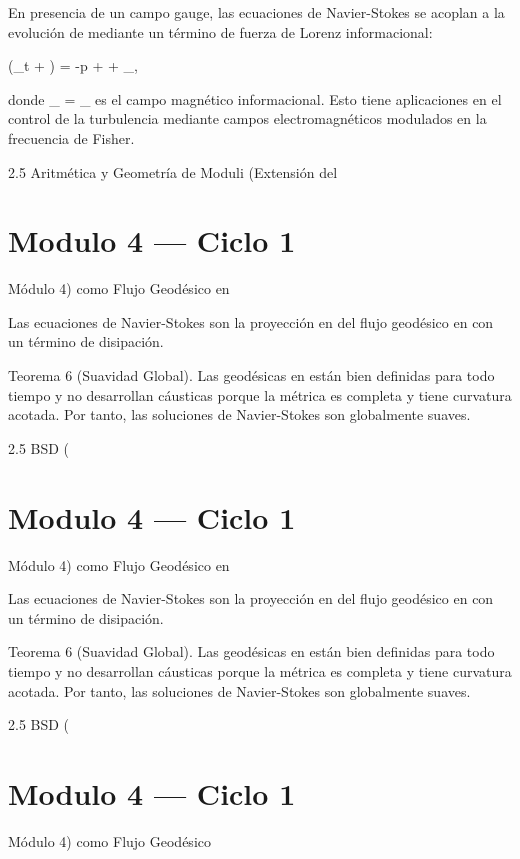 \documentclass[12pt,twoside]{book}
\begin{document}
En presencia de un campo gauge, las ecuaciones de Navier-Stokes se acoplan a la evolución de  \rho  mediante un término de fuerza de Lorenz informacional:

\rho (\partial_t  + \cdot\nabla{}) = -\nabla p + \nu \Delta {} +  \times {}_{},

donde  _{} = \nabla \times {}_{}  es el campo magnético informacional. Esto tiene aplicaciones en el control de la turbulencia mediante campos electromagnéticos modulados en la frecuencia de Fisher.

2.5 Aritmética y Geometría de Moduli (Extensión del 

\chapter{Modulo 4 — Ciclo 1}
Módulo 4) como Flujo Geodésico en   

Las ecuaciones de Navier-Stokes son la proyección en    del flujo geodésico en    con un término de disipación.

Teorema 6 (Suavidad Global). Las geodésicas en    están bien definidas para todo tiempo y no desarrollan cáusticas porque la métrica    es completa y tiene curvatura acotada. Por tanto, las soluciones de Navier-Stokes son globalmente suaves.

2.5 BSD (

\chapter{Modulo 4 — Ciclo 1}
Módulo 4) como Flujo Geodésico en   

Las ecuaciones de Navier-Stokes son la proyección en    del flujo geodésico en    con un término de disipación.

Teorema 6 (Suavidad Global). Las geodésicas en    están bien definidas para todo tiempo y no desarrollan cáusticas porque la métrica    es completa y tiene curvatura acotada. Por tanto, las soluciones de Navier-Stokes son globalmente suaves.

2.5 BSD (

\chapter{Modulo 4 — Ciclo 1}
Módulo 4) como Flujo Geodésico
\end{document}
